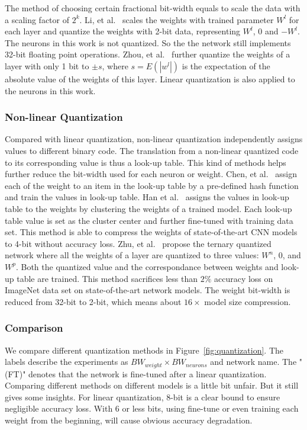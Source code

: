 The method of choosing certain fractional bit-width equals to scale the data with a scaling factor of $2^k$. Li, et al.~\cite{li2016ternary} scales the weights with trained parameter $W^l$ for each layer and quantize the weights with 2-bit data, representing $W^l$, 0 and $-W^l$. The neurons in this work is not quantized. So the the network still implements 32-bit floating point operations. Zhou, et al.~\cite{zhou2016dorefa} further quantize the weights of a layer with only 1 bit to $\pm s$, where $s=E(|w^l|)$ is the expectation of the absolute value of the weights of this layer. Linear quantization is also applied to the neurons in this work.

\subsubsection{Non-linear Quantization}
Compared with linear quantization, non-linear quantization independently assigns values to different binary code. The translation from a non-linear quantized code to its corresponding value is thus a look-up table. This kind of methods helps further reduce the bit-width used for each neuron or weight. Chen, et al.~\cite{chen2015compressing} assign each of the weight to an item in the look-up table by a pre-defined hash function and train the values in look-up table. Han et al.~\cite{han2015deep} assigns the values in look-up table to the weights by clustering the weights of a trained model. Each look-up table value is set as the cluster center and further fine-tuned with training data set. This method is able to compress the weights of state-of-the-art CNN models to 4-bit without accuracy loss. Zhu, et al.~\cite{zhu2016trained} propose the ternary quantized network where all the weights of a layer are quantized to three values: $W^n$, 0, and $W^p$. Both the quantized value and the correspondance between weights and look-up table are trained. This method sacrifices less than $2\%$ accuracy loss on ImageNet data set on state-of-the-art network models. The weight bit-width is reduced from 32-bit to 2-bit, which means about $16\times$ model size compression.

\subsubsection{Comparison}
We compare different quantization methods in Figure~\ref{fig:quantization}. The labels describe the experiments as $BW_{weight}\times BW_{neurons}$ and network name. The "(FT)" denotes that the network is fine-tuned after a linear quantization. Comparing different methods on different models is a little bit unfair. But it still gives some insights. For linear quantization, 8-bit is a clear bound to ensure negligible accuracy loss. With 6 or less bits, using fine-tune or even training each weight from the beginning, will cause obvious accuracy degradation.

